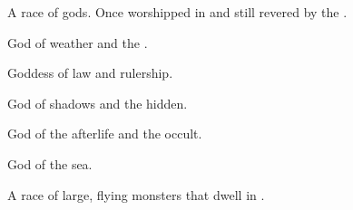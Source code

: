 \begin{gloss}
\begin{comment}
\paragraph{\Taortha}
\end{comment}
\gitem[\Taorthae]{\Taortha}
A race of gods. 
Once worshipped in  and still revered by the . 
  
\begin{gloss}
  \begin{comment}
  \subparagraph{Daxian}
  \end{comment}
    God of weather and the \Wylde{}. 
    
  \begin{comment}
  \subparagraph{Isxae}
  \end{comment}
    Goddess of law and rulership. 
  
  \begin{comment}
  \subparagraph{\Nasshikerr}
  \end{comment}
  \gitem{\Nasshikerr}
    God of shadows and the hidden. 
  
  \begin{comment}
  \subparagraph{\NerrhanKoss}
  \end{comment}
  \gitem{\NerrhanKoss}
    God of the afterlife and the occult. 

  \begin{comment}
  \subparagraph{Shellagh}
  \end{comment}
    God of the sea. 
\end{gloss}








\begin{comment}
\paragraph{\umbra}
\end{comment}
\gitem[\umbrae]{\umbra}
A race of large, flying monsters that dwell in \Nyx. 








\begin{comment}

\end{comment}
\end{gloss}
